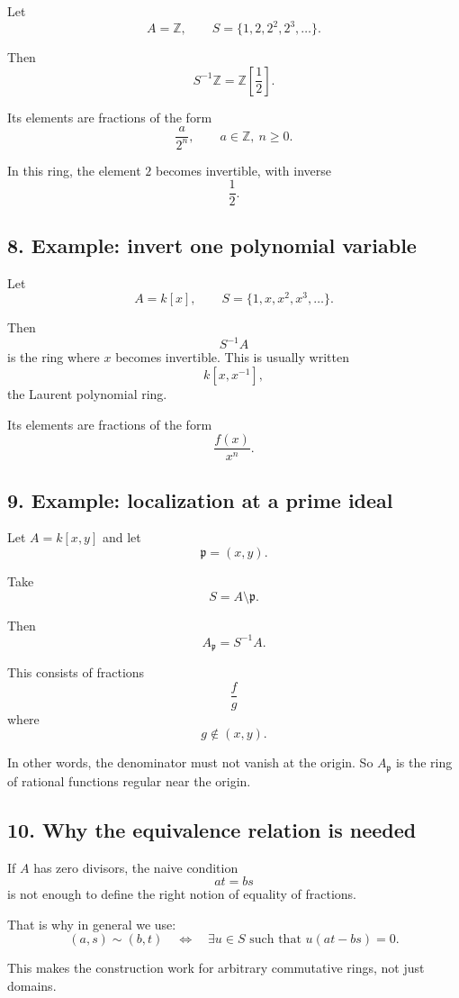 \documentclass[12pt,a4paper]{article}
\theoremstyle{notespace}
\begin{document}
Let
\[
A=\mathbb Z,
\qquad
S=\{1,2,2^2,2^3,\dots\}.
\]

Then
\[
S^{-1}\mathbb Z
=
\mathbb Z\!\left[\frac{1}{2}\right].
\]

Its elements are fractions of the form
\[
\frac{a}{2^n},
\qquad a\in\mathbb Z,\ n\ge 0.
\]

In this ring, the element \(2\) becomes invertible, with inverse
\[
\frac{1}{2}.
\]

\subsection{8. Example: invert one polynomial variable}

Let
\[
A=k[x],
\qquad
S=\{1,x,x^2,x^3,\dots\}.
\]

Then
\[
S^{-1}A
\]
is the ring where \(x\) becomes invertible. This is usually written
\[
k[x,x^{-1}],
\]
the Laurent polynomial ring.

Its elements are fractions of the form
\[
\frac{f(x)}{x^n}.
\]

\subsection{9. Example: localization at a prime ideal}

Let \(A=k[x,y]\) and let
\[
\mathfrak p=(x,y).
\]

Take
\[
S=A\setminus \mathfrak p.
\]

Then
\[
A_{\mathfrak p}=S^{-1}A.
\]

This consists of fractions
\[
\frac{f}{g}
\]
where
\[
g\notin (x,y).
\]

In other words, the denominator must not vanish at the origin. So \(A_{\mathfrak p}\) is the ring of rational functions regular near the origin.

\subsection{10. Why the equivalence relation is needed}

If \(A\) has zero divisors, the naive condition
\[
at=bs
\]
is not enough to define the right notion of equality of fractions.

That is why in general we use:
\[
(a,s)\sim (b,t)
\quad \Longleftrightarrow \quad
\exists u\in S \text{ such that } u(at-bs)=0.
\]

This makes the construction work for arbitrary commutative rings, not just domains.
\end{document}

